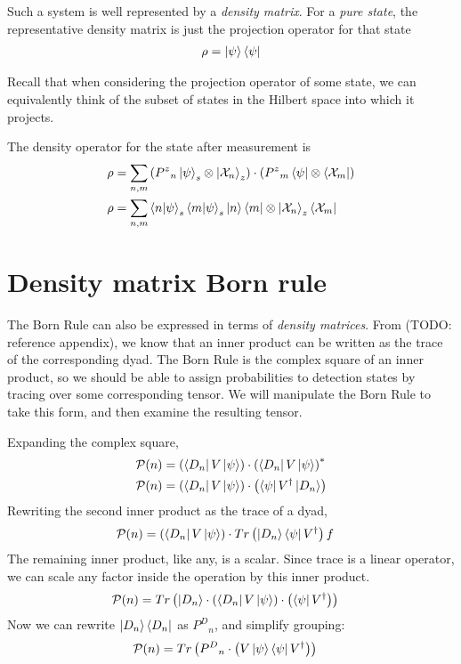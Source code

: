 Such a system is well represented by a \textit{density matrix}. For a \textit{pure state}, the representative density matrix is just the projection operator for that state
\begin{align}
  \rho = \ket{\psi}\bra{\psi}
\end{align}

Recall that when considering the projection operator of some state, we can equivalently think of the subset of states in the Hilbert space into which it projects.

The density operator for the state after measurement is
\begin{align}
\rho &= \sum_{n,m}\left({P^z}_n\ket{\psi}_s \otimes \ket{\mathcal{X}_n}_z \right) \cdot \left({P^z}_m\bra{\psi} \otimes \bra{\mathcal{X}_m} \right) \\
\rho &=  \sum_{n,m}\braket{n|\psi}_s \braket{m|\psi}_s \ket{n}\bra{m} \otimes \ket{\mathcal{X}_n}_z \bra{\mathcal{X}_m}
\end{align}

\section{Density matrix Born rule}
The Born Rule can also be expressed in terms of \textit{density matrices}. From (TODO: reference appendix), we know that an inner product can be written as the trace of the corresponding dyad. The Born Rule is the complex square of an inner product, so we should be able to assign probabilities to detection states by tracing over some corresponding tensor. We will manipulate the Born Rule to take this form, and then examine the resulting tensor.

Expanding the complex square,
\begin{align}
  \mathcal{P}(n) &= \left(\bra{D_n}V\ket{\psi}\right) \cdot \left(\bra{D_n}V\ket{\psi}\right)^* \\
  \mathcal{P}(n) &= \left(\bra{D_n}V\ket{\psi}\right) \cdot \left(\bra{\psi}V^\dagger\ket{D_n}\right)
\end{align}
Rewriting the second inner product as the trace of a dyad,
\begin{align}
  \mathcal{P}(n) &= \left(\bra{D_n}V\ket{\psi}\right) \cdot Tr\left(\ket{D_n}\bra{\psi}V^\dagger\right)f
\end{align}
The remaining inner product, like any, is a scalar. Since trace is a linear operator, we can scale any factor inside the operation by this inner product.
\begin{align}
  \mathcal{P}(n) &= Tr\left(\ket{D_n} \cdot \left(\bra{D_n}V\ket{\psi}\right) \cdot \left(\bra{\psi}V^\dagger\right)\right)
\end{align}
Now we can rewrite $\ket{D_n}\bra{D_n}$ as ${P^D}_n$, and simplify grouping:
\begin{align}
  \mathcal{P}(n) &= Tr\left({P^D}_n \cdot \left(V\ket{\psi}\bra{\psi}V^\dagger\right)\right)
\end{align}

